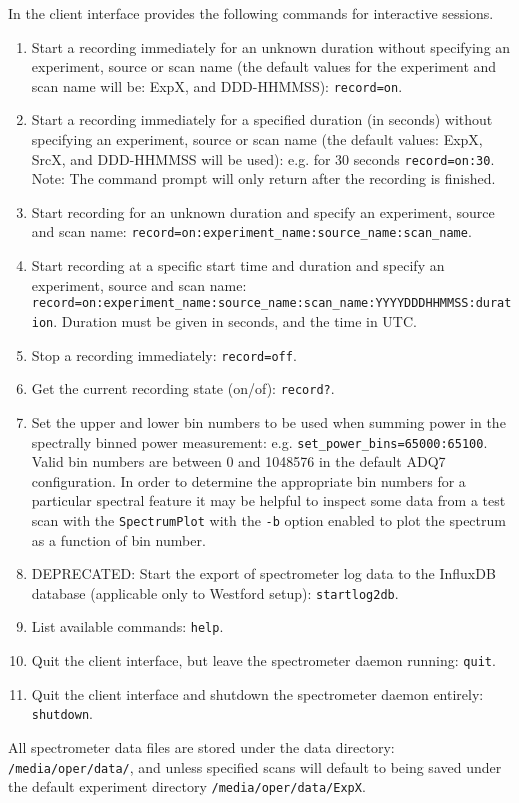 \documentclass[a4paper,14pt]{article}
\begin{document}
In the client interface provides the following commands for interactive sessions.
\begin{enumerate}
 \item Start a recording immediately for an unknown duration without specifying an experiment, source or scan name (the default values for the experiment and scan name will be: ExpX, and DDD-HHMMSS): \verb|record=on|.
 \item Start a recording immediately for a specified duration (in seconds) without specifying an experiment, source or scan name (the default values: ExpX, SrcX, and DDD-HHMMSS will be used): e.g. for 30 seconds \verb|record=on:30|. Note: The command prompt
 will only return after the recording is finished.
 \item Start recording for an unknown duration and specify an experiment, source and scan name: \verb|record=on:experiment_name:source_name:scan_name|.
 \item Start recording at a specific start time and duration and specify an experiment, source and scan name: \verb|record=on:experiment_name:source_name:scan_name:YYYYDDDHHMMSS:duration|. Duration must be given in seconds, and the time in UTC.
 \item Stop a recording immediately: \verb|record=off|.
 \item Get the current recording state (on/of): \verb|record?|.
 \item Set the upper and lower bin numbers to be used when summing power in the spectrally binned power measurement: e.g. \verb|set_power_bins=65000:65100|. Valid bin numbers are between 0 and 1048576 in the default ADQ7 configuration. In order to determine
 the appropriate bin numbers for a particular spectral feature it may be helpful to inspect some data from a test scan with the \verb|SpectrumPlot| with the \verb|-b| option enabled to plot the spectrum as a function of bin number.
  \item DEPRECATED: Start the export of spectrometer log data to the InfluxDB database (applicable only to Westford setup): \verb|startlog2db|.
 \item List available commands: \verb|help|.
 \item Quit the client interface, but leave the spectrometer daemon running: \verb|quit|.
 \item Quit the client interface and shutdown the spectrometer daemon entirely: \verb|shutdown|.
 
\end{enumerate}

All spectrometer data files are stored under the data directory: \verb|/media/oper/data/|, and unless specified scans will default to being saved under the default experiment directory \verb|/media/oper/data/ExpX|.
\end{document}
